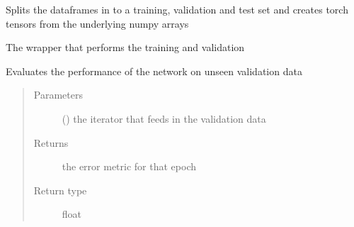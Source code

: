 \documentclass[letterpaper,10pt,english]{sphinxmanual}
\begin{document}
\begin{fulllineitems}
\begin{fulllineitems}
\end{fulllineitems}


\begin{fulllineitems}
\label{\detokenize{index:Src.deeplearning.DeepLearning.train_val_test}}
Splits the dataframes in to a training, validation
and test set and creates torch tensors from the underlying
numpy arrays

\end{fulllineitems}


\begin{fulllineitems}
\label{\detokenize{index:Src.deeplearning.DeepLearning.training_wrapper}}
The wrapper that performs the training and validation

\end{fulllineitems}


\begin{fulllineitems}
\label{\detokenize{index:Src.deeplearning.DeepLearning.validate}}
Evaluates the performance of the network
on unseen validation data
\begin{quote}\begin{description}
\item[{Parameters}] \leavevmode
{} () \textendash{} the iterator that feeds in the validation data

\item[{Returns}] \leavevmode
the error metric for that epoch

\item[{Return type}] \leavevmode
float

\end{description}\end{quote}

\end{fulllineitems}


\end{fulllineitems}
\end{document}
